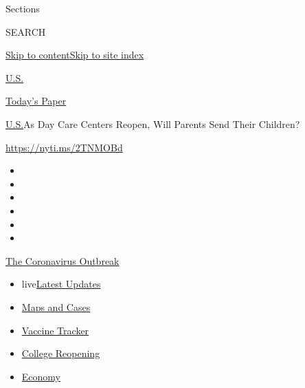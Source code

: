 Sections

SEARCH

\protect\hyperlink{site-content}{Skip to
content}\protect\hyperlink{site-index}{Skip to site index}

\href{https://www.nytimes3xbfgragh.onion/section/us}{U.S.}

\href{https://myaccount.nytimes3xbfgragh.onion/auth/login?response_type=cookie\&client_id=vi}{}

\href{https://www.nytimes3xbfgragh.onion/section/todayspaper}{Today's
Paper}

\href{/section/us}{U.S.}\textbar{}As Day Care Centers Reopen, Will
Parents Send Their Children?

\url{https://nyti.ms/2TNMOBd}

\begin{itemize}
\item
\item
\item
\item
\item
\item
\end{itemize}

\href{https://www.nytimes3xbfgragh.onion/news-event/coronavirus?action=click\&pgtype=Article\&state=default\&region=TOP_BANNER\&context=storylines_menu}{The
Coronavirus Outbreak}

\begin{itemize}
\tightlist
\item
  live\href{https://www.nytimes3xbfgragh.onion/2020/08/04/world/coronavirus-cases.html?action=click\&pgtype=Article\&state=default\&region=TOP_BANNER\&context=storylines_menu}{Latest
  Updates}
\item
  \href{https://www.nytimes3xbfgragh.onion/interactive/2020/us/coronavirus-us-cases.html?action=click\&pgtype=Article\&state=default\&region=TOP_BANNER\&context=storylines_menu}{Maps
  and Cases}
\item
  \href{https://www.nytimes3xbfgragh.onion/interactive/2020/science/coronavirus-vaccine-tracker.html?action=click\&pgtype=Article\&state=default\&region=TOP_BANNER\&context=storylines_menu}{Vaccine
  Tracker}
\item
  \href{https://www.nytimes3xbfgragh.onion/2020/08/02/us/covid-college-reopening.html?action=click\&pgtype=Article\&state=default\&region=TOP_BANNER\&context=storylines_menu}{College
  Reopening}
\item
  \href{https://www.nytimes3xbfgragh.onion/live/2020/08/04/business/stock-market-today-coronavirus?action=click\&pgtype=Article\&state=default\&region=TOP_BANNER\&context=storylines_menu}{Economy}
\end{itemize}

